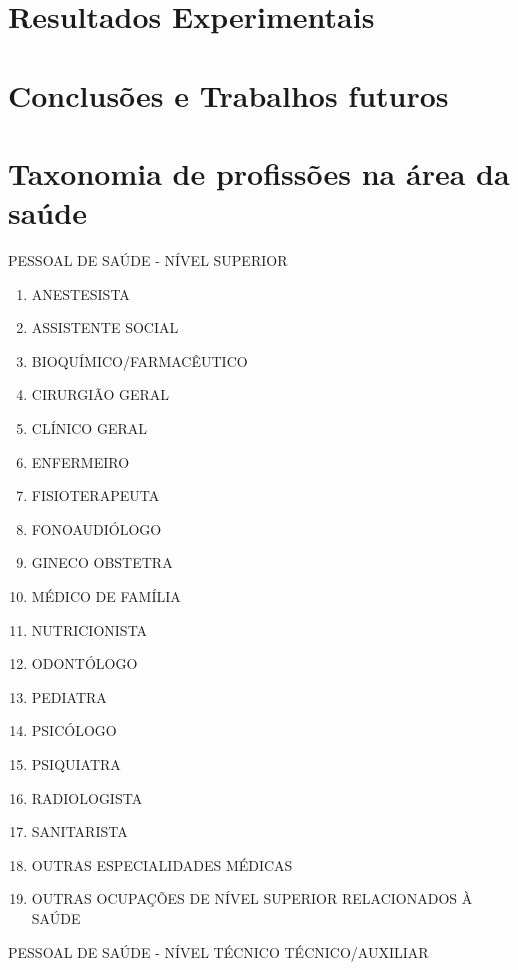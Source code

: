 \documentclass[a4paper,11pt]{article}
\begin{document}
\newpage
\section{Resultados Experimentais}



\newpage
\section{Conclusões e Trabalhos futuros}




\appendix
\section{Taxonomia de profissões na área da saúde}
\label{app:anexoI}
PESSOAL DE SAÚDE - NÍVEL SUPERIOR
\begin{enumerate}
    \item ANESTESISTA
    \item ASSISTENTE SOCIAL
    \item BIOQUÍMICO/FARMACÊUTICO
    \item CIRURGIÃO GERAL
    \item CLÍNICO GERAL
    \item ENFERMEIRO
    \item FISIOTERAPEUTA
    \item FONOAUDIÓLOGO
    \item GINECO OBSTETRA
    \item MÉDICO DE FAMÍLIA
    \item NUTRICIONISTA
    \item ODONTÓLOGO
    \item PEDIATRA
    \item PSICÓLOGO
    \item PSIQUIATRA
    \item RADIOLOGISTA
    \item SANITARISTA
    \item OUTRAS ESPECIALIDADES MÉDICAS
    \item OUTRAS OCUPAÇÕES DE NÍVEL SUPERIOR RELACIONADOS À SAÚDE
\end{enumerate}
PESSOAL DE SAÚDE - NÍVEL TÉCNICO TÉCNICO/AUXILIAR
\end{document}
